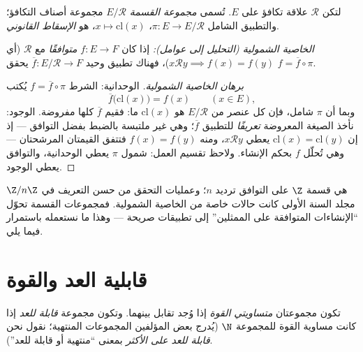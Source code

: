 \begin{definition}\label{def:b2:structures:quotient}
لتكن $\mathcal{R}$ علاقة تكافؤ على $E$. تُسمى
\emph{مجموعة القسمة} $E/\mathcal{R}$ مجموعة
أصناف التكافؤ؛ والتطبيق الشامل $\pi \colon E \to E/\mathcal{R}$،
$x \mapsto \mathrm{cl}(x)$، هو \emph{الإسقاط
القانوني}.

\emph{الخاصية الشمولية (التحليل إلى عوامل):} إذا كان $f \colon E \to F$
\emph{متوافقًا} مع $\mathcal{R}$ (أي $x \mathbin{\mathcal{R}}
y \implies f(x) = f(y)$)، فهناك تطبيق وحيد $\overline f
\colon E/\mathcal{R} \to F$ يحقق $f = \overline f \circ \pi$.
\end{definition}

\begin{proof}[برهان الخاصية الشمولية]
الوحدانية: الشرط $f = \overline f \circ \pi$ يُكتب
\[
\overline f\bigl(\mathrm{cl}(x)\bigr) = f(x)
\qquad (x \in E),
\]
وبما أن $\pi$ شامل، فإن كل عنصر من
$E/\mathcal{R}$ هو $\mathrm{cl}(x)$ ما: فقيم
$\overline f$ كلها مفروضة. الوجود: نأخذ الصيغة المعروضة
\emph{تعريفًا} للتطبيق $\overline f$؛ وهي غير ملتبسة
بالضبط بفضل التوافق --- إذ إن $\mathrm{cl}(x) =
\mathrm{cl}(y)$ يعطي $x \mathbin{\mathcal{R}} y$، ومنه $f(x) =
f(y)$ فتتفق القيمتان المرشحتان --- وهي تُحلّل
$f$ بحكم الإنشاء. ولاحظ تقسيم العمل: شمول
$\pi$ يعطي الوحدانية، والتوافق يعطي الوجود.
\end{proof}

\begin{example}
$\Z/n\Z$ هي قسمة $\Z$ على التوافق ترديد $n$؛ وعمليات
التحقق من حسن التعريف في مجلد السنة الأولى كانت حالات خاصة من
الخاصية الشمولية. فمجموعات القسمة تحوّل ``الإنشاءات المتوافقة على
الممثلين'' إلى تطبيقات صريحة --- وهذا ما نستعمله باستمرار فيما يلي.
\end{example}

\section{قابلية العد والقوة}

\begin{definition}\label{def:b2:structures:countable}
تكون مجموعتان \emph{متساويتي القوة} إذا وُجد تقابل
بينهما. وتكون مجموعة \emph{قابلة للعد} إذا
كانت مساوية القوة للمجموعة $\N$ (يُدرج بعض المؤلفين المجموعات المنتهية؛ نقول
نحن \emph{قابلة للعد على الأكثر} بمعنى ``منتهية أو قابلة للعد'').
\end{definition}

